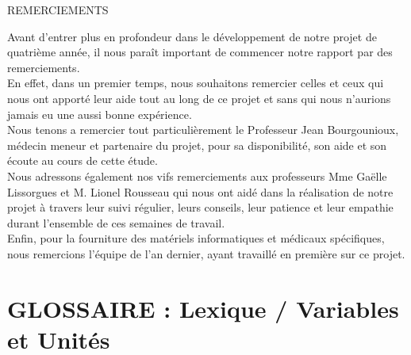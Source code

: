 \documentclass [11pt]{article}
\begin{document}
\newpage
\begin{center}
\huge REMERCIEMENTS
\end{center}

\par Avant d'entrer plus en profondeur dans le développement de notre projet de quatrième année, il nous paraît important de commencer notre rapport par des remerciements. \\

En effet, dans un premier temps, nous souhaitons remercier celles et ceux qui nous ont apporté leur aide tout au long de ce projet et sans qui nous n'aurions jamais eu une aussi bonne expérience.\\

Nous tenons a remercier tout particulièrement le Professeur Jean Bourgounioux, médecin meneur et partenaire du projet, pour sa disponibilité, son aide et son écoute au cours de cette étude.\\

Nous adressons également nos vifs remerciements aux professeurs Mme Gaëlle Lissorgues et M. Lionel Rousseau qui nous ont aidé dans la réalisation de notre projet à travers leur suivi régulier, leurs conseils, leur patience et leur empathie durant l'ensemble de ces semaines de travail. \\

Enfin, pour la fourniture des matériels informatiques et médicaux spécifiques, nous remercions l'équipe de l'an dernier, ayant travaillé en première sur ce projet. \\

\newpage
\tableofcontents


\newpage
\section{GLOSSAIRE : Lexique / Variables et Unités }
\end{document}
